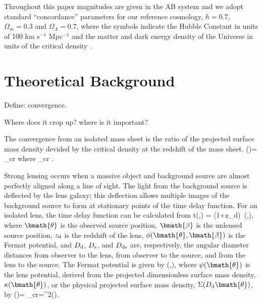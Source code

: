 \documentclass[useAMS,usenatbib]{mn2e}
\begin{document}
Throughout this paper magnitudes are given in the AB system \citep{Oke74} and
we adopt standard ``concordance'' parameters for our reference cosmology, \ie
$h=0.7$, $\Omega_m=0.3$ and $\Omega_\Lambda=0.7$, where the symbols indicate
the Hubble Constant in units of 100 km s$^{-1}$ Mpc$^{-1}$ and the matter and
dark energy density of the Universe in units of the critical density
\citep[e.g.\ ][]{Kom++09}.



\section{Theoretical Background}
\label{sec:theory}



Define: convergence.

Where does it crop up? where is it important?

The convergence from an isolated mass sheet is the ratio of the projected surface mass density devided by the critical density at the redshift of the mass sheet.
\be
\kappa(\bmath{\theta})=  {\Sigma_{\rm cr}}
\ee
where 
\be \label{eq:sigcrit} 
\Sigma_{\rm cr} \equiv {}.
\ee


Strong lensing occurs when a massive object and background source are almost perfectly
aligned along a line of sight. The light from the background source is deflected by the
lens galaxy; this deflection allows multiple images of the background source to form
at stationary points of the time delay function. For an isolated lens, the time delay
function can be calculated from
\be \label{eq:T} 
\Delta t(\bmath{\theta},\bmath{\beta}) =   (1+z_{\rm d})\, \phi(\bmath{\theta},\bmath{\beta}),
\ee
where $\bmath{\theta}$ is the observed source position, $\bmath{\beta}$ is the 
unlensed source position, $z_{\rm d}$ is the redshift of the lens, $\phi(\bmath{\theta},\bmath{\beta})$ is
the Fermat potential, and $D_{\rm d}$, $D_{\rm s}$, and $D_{\rm ds}$
are, respectively, the angular diameter distances from observer to the lens, from observer
to the source, and from the lens to the source. The Fermat potential is given by
\be \label{eq:FP}
\phi(\bmath{\theta},\bmath{\beta})\equiv {}, 
\ee
where $\psi(\bmath{\theta})$ is the lens potential, derived from the projected dimensionless
surface mass density, $\kappa(\bmath{\theta})$, or the physical projected surface mass density,
$\Sigma(D_{\rm d} \bmath{\theta})$, by 
\be \label{eq:psikappa}
\kappa(\bmath{\theta})=  {\Sigma_{\rm cr}}=\nabla^2\psi(\bmath{\theta}).
\ee
\end{document}
